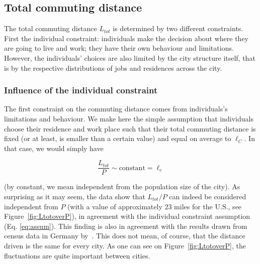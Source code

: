 \subsection{Total commuting distance}
\label{sec:total_length_driven}

The total commuting distance $L_{tot}$ is determined by two different
constraints. First the individual constraint: individuals make the decision
about where they are going to live and work; they have their own behaviour and
limitations. However, the individuals' choices are also limited by the city
structure itself, that is by the respective distributions of jobs and residences across the
city.



\subsubsection{Influence of the individual constraint} 

The first constraint on the commuting distance comes from individuals's limitations and
behaviour. We make here the simple assumption that individuals choose their
residence and work place such that their total commuting distance is fixed (or
at least, is smaller than a certain value) and equal on average to $\ell_C$. In that
case, we would simply have

\begin{equation} 
    \frac{L_{tot}}{P} \sim \text{constant} = \ell_c 
    \label{eq:assum}
\end{equation}

(by constant, we mean independent from the population size of the city). As
surprising as it may seem, the data show that $L_{tot}/P$ can indeed be considered
 independent from $P$ (with a value of approximately $23$ miles for
the U.S., see Figure~\ref{fig:LtotoverP}), in agreement with the individual
constraint assumption (Eq. \ref{eq:assum}). This finding is also in agreement
with the results drawn from census data in Germany by~\cite{Wilkerson:2014}.
This does not mean, of course, that the distance driven is the same for every
city. As one can see on Figure~\ref{fig:LtotoverP}, the fluctuations are quite
important between cities.  

